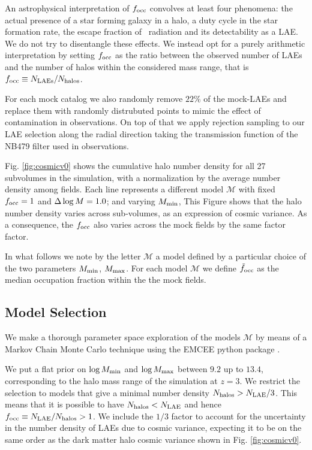 \documentclass{emulateapj}
\newcommand{\ly}{{\ifmmode{{\rm Ly}\alpha}\else{Ly$\alpha$}\fi}}
\newcommand{\mmin}{{\ifmmode{{M_{\rm min}}}\else{${M_{\rm min}}$}\fi}}
\newcommand{\mmax}{{\ifmmode{{M_{\rm max}}}\else{${M_{\rm max}}$}\fi}}
\newcommand{\dlm}{{\ifmmode{{\Delta \log M}}\else{$\Delta \log M$}\fi}}
\newcommand{\focc}{{\ifmmode{{f_{\rm occ}}}\else{${f_{\rm occ}}$}\fi}}
\begin{document}
An astrophysical interpretation of $f_{\rm occ}$ convolves at least
four phenomena: the actual presence of a star forming galaxy in a
halo, a duty cycle in the star formation rate, the escape fraction of
\ly\ radiation and its detectability as a LAE.   
We do not try to disentangle these effects.
We instead opt for a purely arithmetic interpretation by setting
$\focc$ as the ratio between the observed number of LAEs and the
number of halos within the considered mass range, that is $\focc \equiv N_{\rm
  LAEs}/N_{\mathrm{halos}}$.   

For each mock catalog we also randomly remove $22\%$ of the mock-LAEs and replace 
them with randomly distrubuted points to mimic the effect of
contamination in \citet{Bielby16} observations. 
On top of that we apply rejection sampling  to our LAE selection 
along the radial direction taking the transmission function of the
NB479 filter used in \citet{Bielby16} observations. 


Fig. \ref{fig:cosmicv0}  shows the cumulative halo number density
for all 27 subvolumes in the simulation, with a normalization by the
average number density among fields. 
Each line represents a different model $\mathcal{M}$ with fixed
$\focc=1$ and $\dlm=1.0$; and varying $\mmin$, 
This Figure shows that the halo number density varies across
sub-volumes, as an expression of cosmic variance. 
As a consequence, the $\focc$ also varies across the mock fields  
by the same factor factor. 



In what follows we note by the letter ${\mathcal M}$ a model
defined by a particular choice of the two parameters $M_{\rm min}$, 
$M_{\rm  max}$. For each model  ${\mathcal M}$ we define
$\tilde{f}_{\rm occ}$ as the median occupation fraction within the the
mock fields.

\subsection{Model Selection}
\label{subsec:explore}



We make a thorough parameter space exploration of the models
${\mathcal M}$ by  means of a Markov Chain Monte Carlo technique using
the EMCEE python package \citep{emcee2013}. 

We put a flat prior on $\log M_{\rm min}$ and $\log \mmax$ between
$9.2$ up to $13.4$, corresponding to the halo mass range of 
the simulation at $z=3$.  
We restrict the selection to models that give a minimal number density 
$N_{\rm{halos}}>N_{\rm LAE}/3$.   
This means that it is possible to have $N_{\rm{halos}} < N_{\rm LAE}$
and hence $\focc\equiv N_{\rm{LAE}}/N_{\rm{halos}}>1$.   
We include the $1/3$ factor to account for the uncertainty in the number 
density of LAEs due to cosmic variance, expecting it to be on the
same order as the dark matter halo cosmic variance shown in
Fig. \ref{fig:cosmicv0}.   
\end{document}
